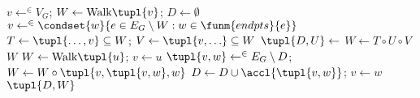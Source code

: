 \begin{algorithmic}
\State $v\gets^{\in}V_G$; $W\gets\mbox{Walk}\tupl{v}$; $D\gets\emptyset$
\State $v\gets^{\in}\condset{w}{e\in E_G\setminus W:w\in\funm{endpts}{e}}$
\State $T\gets\tupl{\ldots,v}\subseteq W$; $V\gets\tupl{v,\ldots}\subseteq W$
\State $\tupl{D,U}\gets$
\State $W\gets T\circ U\circ V$
\EndWhile
\State \Return $W$
\EndFunction
{}
\State $W\gets\mbox{Walk}\tupl{u}$; $v\gets u$
\Repeat
\State $\tupl{v,w}\gets^{\in}E_G\setminus D$; $W\gets W\circ\tupl{v,\tupl{v,w},w}$
\State $D\gets D\cup\accl{\tupl{v,w}}$; $v\gets w$
\State \Return $\tupl{D,W}$
\EndFunction
\end{algorithmic}